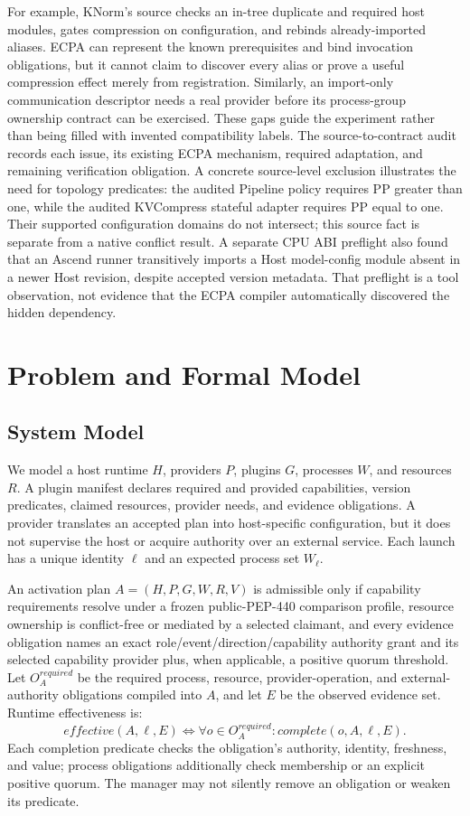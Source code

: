 \documentclass[letterpaper,twocolumn,10pt]{article}
\begin{document}
For example, KNorm's source checks an in-tree duplicate and required host
modules, gates compression on configuration, and rebinds already-imported
aliases. ECPA can represent the known prerequisites and bind invocation
obligations, but it cannot claim to discover every alias or prove a useful
compression effect merely from registration. Similarly, an import-only
communication descriptor needs a real provider before its process-group
ownership contract can be exercised. These gaps guide the experiment rather
than being filled with invented compatibility labels. The source-to-contract
audit records each issue, its existing ECPA mechanism, required adaptation,
and remaining verification obligation. A concrete source-level exclusion
illustrates the need for topology predicates: the audited Pipeline policy
requires PP greater than one, while the audited KVCompress stateful adapter
requires PP equal to one. Their supported configuration domains do not
intersect; this source fact is separate from a native conflict result.
A separate CPU ABI preflight also found that an Ascend runner transitively
imports a Host model-config module absent in a newer Host revision, despite
accepted version metadata. That preflight is a tool observation, not evidence
that the ECPA compiler automatically discovered the hidden dependency.

\section{Problem and Formal Model}
\subsection{System Model}
We model a host runtime $H$, providers $P$, plugins $G$, processes $W$, and
resources $R$.  A plugin manifest declares required and provided capabilities,
version predicates, claimed resources, provider needs, and evidence
obligations.  A provider translates an accepted plan into host-specific
configuration, but it does not supervise the host or acquire authority over an
external service.  Each launch has a unique identity $\ell$ and an expected
process set $W_\ell$.

An activation plan $A=(H,P,G,W,R,V)$ is admissible only if capability
requirements resolve under a frozen public-PEP-440 comparison profile,
resource ownership is conflict-free or mediated by a selected claimant, and
every evidence obligation names an exact role/event/direction/capability
authority grant and its selected capability provider plus, when applicable, a
positive quorum threshold.  Let $O_A^{required}$ be the required process,
resource, provider-operation, and external-authority obligations compiled into
$A$, and let $E$ be the observed evidence set.  Runtime effectiveness is:
\begin{equation*}
effective(A,\ell,E) \iff
\forall o \in O_A^{required}: complete(o,A,\ell,E).
\end{equation*}
Each completion predicate checks the obligation's authority, identity,
freshness, and value; process obligations additionally check membership or an
explicit positive quorum.  The manager may not silently remove an obligation
or weaken its predicate.
\end{document}
